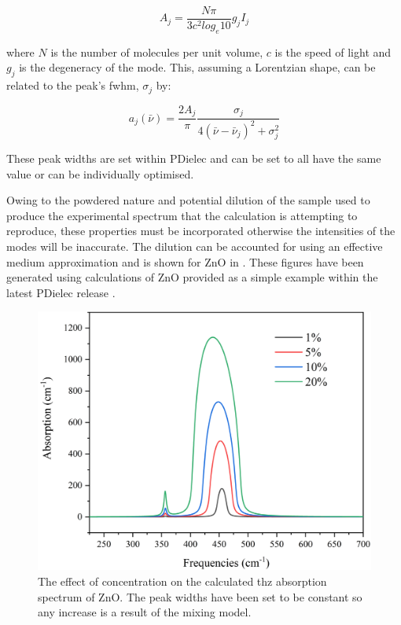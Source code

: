 \begin{equation}
A_j = \frac{N \pi}{3 c^2 log_e 10} g_j I_j
\end{equation}

where \(N\) is the number of molecules per unit volume, \(c\) is the speed of light and \(g_j\) is the degeneracy of the mode. This, assuming a Lorentzian shape, can be related to the peak's \acrfull{fwhm}, \(\sigma_j\) by:

\begin{equation}
a_j(\bar{\nu}) = \frac{2 A_j}{\pi} \frac{\sigma_j}{4(\bar{\nu} - \bar{\nu}_j)^2 + \sigma_j^2}
\end{equation}

These peak widths are set within PDielec and can be set to all have the same value or can be individually optimised.

Owing to the powdered nature and potential dilution of the sample used to produce the experimental spectrum that the calculation is attempting to reproduce, these properties must be incorporated otherwise the intensities of the modes will be inaccurate. The dilution can be accounted for using an effective medium approximation and is shown for ZnO in . These figures have been generated using calculations of ZnO provided as a simple example within the latest PDielec release \cite{john_kendrick_2022_5888313}.

\begin{figure}
    \centering
    \includegraphics[scale=0.6]{Figures/Misc/Theory/ConcentrationG.png}
    \captionsetup{font = footnotesize, justification = centering}
    \caption[The Effect of Concentration on the Calculated THz Absorption Spectrum of ZnO]{The effect of concentration on the calculated \acrshort{thz} absorption spectrum of ZnO. The peak widths have been set to be constant so any increase is a result of the mixing model.}
    \label{fig:ConcPDGUI}
\end{figure}

